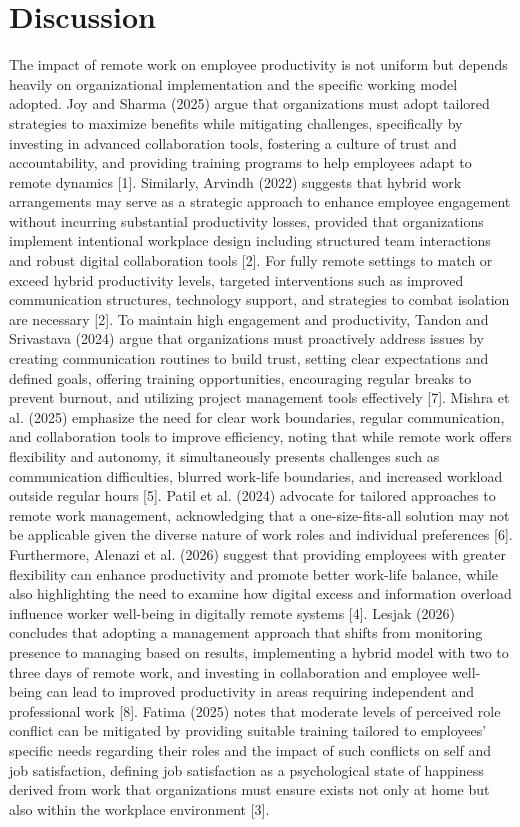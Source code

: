 \documentclass[conference]{IEEEtran}
\begin{document}
\section{Discussion}
The impact of remote work on employee productivity is not uniform but depends heavily on organizational implementation and the specific working model adopted. Joy and Sharma (2025) argue that organizations must adopt tailored strategies to maximize benefits while mitigating challenges, specifically by investing in advanced collaboration tools, fostering a culture of trust and accountability, and providing training programs to help employees adapt to remote dynamics [1]. Similarly, Arvindh (2022) suggests that hybrid work arrangements may serve as a strategic approach to enhance employee engagement without incurring substantial productivity losses, provided that organizations implement intentional workplace design including structured team interactions and robust digital collaboration tools [2]. For fully remote settings to match or exceed hybrid productivity levels, targeted interventions such as improved communication structures, technology support, and strategies to combat isolation are necessary [2]. To maintain high engagement and productivity, Tandon and Srivastava (2024) argue that organizations must proactively address issues by creating communication routines to build trust, setting clear expectations and defined goals, offering training opportunities, encouraging regular breaks to prevent burnout, and utilizing project management tools effectively [7]. Mishra et al. (2025) emphasize the need for clear work boundaries, regular communication, and collaboration tools to improve efficiency, noting that while remote work offers flexibility and autonomy, it simultaneously presents challenges such as communication difficulties, blurred work-life boundaries, and increased workload outside regular hours [5]. Patil et al. (2024) advocate for tailored approaches to remote work management, acknowledging that a one-size-fits-all solution may not be applicable given the diverse nature of work roles and individual preferences [6]. Furthermore, Alenazi et al. (2026) suggest that providing employees with greater flexibility can enhance productivity and promote better work-life balance, while also highlighting the need to examine how digital excess and information overload influence worker well-being in digitally remote systems [4]. Lesjak (2026) concludes that adopting a management approach that shifts from monitoring presence to managing based on results, implementing a hybrid model with two to three days of remote work, and investing in collaboration and employee well-being can lead to improved productivity in areas requiring independent and professional work [8]. Fatima (2025) notes that moderate levels of perceived role conflict can be mitigated by providing suitable training tailored to employees' specific needs regarding their roles and the impact of such conflicts on self and job satisfaction, defining job satisfaction as a psychological state of happiness derived from work that organizations must ensure exists not only at home but also within the workplace environment [3].
\end{document}

